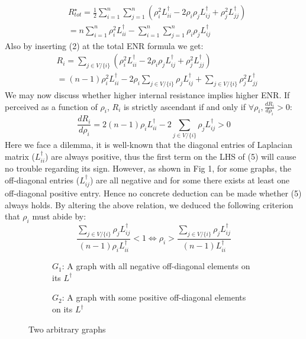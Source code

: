 \documentclass{article}
\begin{document}
	\begin{equation}
		\begin{aligned}
			&R_{tot}^{\star}=\frac{1}{2}\sum_{i=1}^{n}\sum_{j=1}^{n} \left(\rho_i^{2} L_{ii}^{\dag} - 2\rho_i \rho_j L_{ij}^{\dag} + \rho_j^{2} L_{jj}^{\dag} \right) \\
			&= n\sum_{i=1}^{n} \rho_i^{2}L_{ii}^{\dag} - \sum_{i=1}^{n}\sum_{j=1}^{n} \rho_i\rho_j L_{ij}^{\dag}
		\end{aligned}
	\end{equation} 
	Also by inserting (2) at the total ENR formula we get:
	\begin{equation}
	\begin{aligned}
		&R_i = \sum_{j\in V/ \{i\}} \left( \rho_i^{2} L_{ii}^{\dag} - 2\rho_i \rho_j L_{ij}^{\dag} + \rho_j^{2} L_{jj}^{\dag} \right) \\
		&=(n-1)\rho_i^{2}L_{ii}^{\dag}-2\rho_i \sum_{j\in V/ \{i\}} \rho_j L_{ij}^{\dag} + \sum_{j\in V/ \{i\}} \rho_j^{2} L_{jj}^{\dag}
	\end{aligned}
	\end{equation}
	We may now discuss whether higher internal resistance implies higher ENR. If perceived as a function of $\rho_i$, $R_i$ is strictly ascendant if and only if $\forall \rho_i, \frac{dR_i}{d\rho_i} > 0$:
	\begin{equation}
		\frac{dR_i}{d \rho_i} = 2(n-1)\rho_i L_{ii}^{\dag} - 2\sum_{j\in V / \{i\}} \rho_j L_{ij}^{\dag} > 0
	\end{equation}
	Here we face a dilemma, it is well-known that the diagonal entries of Laplacian matrix ($L_{ii}^{\dag}$) are always positive, thus the first term on the LHS of (5) will cause no trouble regarding its sign. However, as shown in Fig 1, for some graphs, the off-diagonal entries ($L_{ij}^{\dag}$) are all negative and for some there exists at least one off-diagonal positive entry. Hence no concrete deduction can be made whether (5) always holds. By altering the above relation, we deduced the following criterion that $\rho_i$ must abide by:
	\begin{equation}
		\frac{\sum_{j\in V / \{i\}} \rho_j L_{ij}^{\dag}} {(n-1)\rho_i L_{ii}^{\dag}} < 1 \Longleftrightarrow \rho_i > \frac{\sum_{j\in V / \{i\}} \rho_j L_{ij}^{\dag}} {(n-1) L_{ii}^{\dag}}
	\end{equation}
	\newline
	\begin{figure}[t!]
		\centering
		\begin{subfigure}[t]{0.4\textwidth}
			\centering
			
			\caption{$G_1$: A graph with all negative off-diagonal elements on its $L^{\dag}$}
			\label{fig:3-a}
		\end{subfigure}
		\hfill
		\begin{subfigure}[t]{0.4\textwidth}
			\centering
			
			\caption{$G_2$: A graph with some positive off-diagonal elements on its $L^{\dag}$}
			\label{fig:3-b}
		\end{subfigure}
		\caption{Two arbitrary graphs}
		\label{fig:3}
	\end{figure}
	
\end{document}

